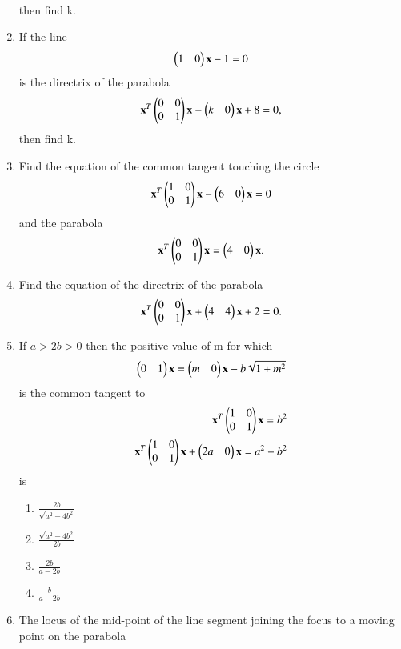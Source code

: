 \begin{enumerate}[label=\arabic*.,ref=\thesubsection.\theenumi]
\begin{align}
    \end{align} then find k.
\item If the line 
    \begin{align}
    \begin{pmatrix}1&0\end{pmatrix}\mathbf{x}-1=0
    \end{align}is the directrix of the parabola 
    \begin{align}
    \mathbf{x}^T \begin{pmatrix}0 & 0 \\0 & 1\end{pmatrix}\mathbf{x}-\begin{pmatrix}k&0\end{pmatrix}\mathbf{x}+8=0,
    \end{align}then find k. 
\item Find the equation of the common tangent touching the circle 
    \begin{align}
    \mathbf {x}^T\begin{pmatrix}1 & 0 \\0 & 1\end{pmatrix}\mathbf{x}-\begin{pmatrix}6&0\end{pmatrix}\mathbf{x} =0
    \end{align} and the parabola 
    \begin{align}\mathbf{x}^T \begin{pmatrix}0 & 0 \\0 & 1\end{pmatrix}\mathbf{x}=\begin{pmatrix}4&0\end{pmatrix}\mathbf{x}.
    \end{align}
\item Find the equation of the directrix of the parabola 
    \begin{align}
    \mathbf{x}^T\begin{pmatrix}0 & 0 \\0 & 1\end{pmatrix}\mathbf{x}+\begin{pmatrix}4&4\end{pmatrix}\mathbf{x}+2=0.
    \end{align}
\item If $a>2b>0$ then the positive value of m for which 
	\begin{align}
    \begin{pmatrix}0&1\end{pmatrix}\mathbf {x}=\begin{pmatrix}m&0\end{pmatrix}\mathbf {x}-b\sqrt{1+m^2}
    \end{align} is the common tangent to 
    \begin{align}
    \mathbf {x}^T\begin{pmatrix}1 & 0 \\0 & 1\end{pmatrix}\mathbf{x}=b^2\\ 
    \mathbf {x}^T\begin{pmatrix}1 & 0 \\0 &1\end{pmatrix}\mathbf{x}+\begin{pmatrix}2a&0\end{pmatrix}\mathbf{x}=a^2-b^2
    \end{align} is 
    \begin{enumerate}
    \item $\frac{2b}{\sqrt{a^2-4b^2}}$
    \item $\frac{\sqrt{a^2-4b^2}}{2b}$
    \item $\frac{2b}{a-2b}$
    \item $\frac{b}{a-2b}$
    \end{enumerate}
\item The locus of the mid-point of the line segment joining the focus to a moving point on the 			parabola  

\end{enumerate}
